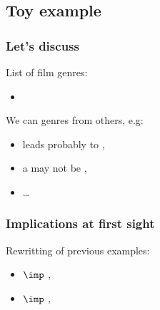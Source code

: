 
\subsection{Toy example}

\begin{frame}
\frametitle{Let's discuss}

List of film genres:
\begin{itemize}
	\item {}
\end{itemize}

\vspace{1.2em}

We can  genres from others, e.g:
\begin{itemize}
	\item {} leads probably to ,
	\item a  may not be ,
	\item \dots
\end{itemize}
\end{frame}

\begin{frame}
\frametitle{Implications at first sight}

Rewritting of previous examples:
\begin{itemize}
	\item {} $\imp$ ,
	\item {} $\imp$ ,
\end{itemize}

\end{frame}